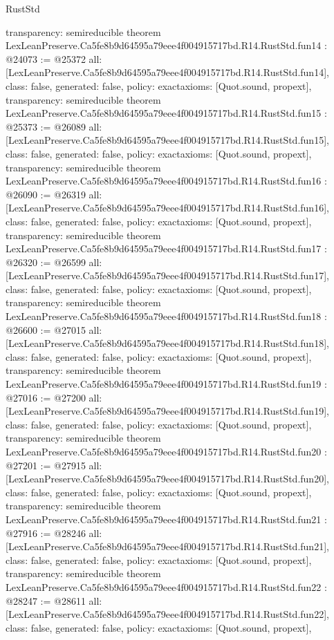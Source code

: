 \begin{lexlean}{RustStd}
\begin{coremodule}
{  transparency: semireducible
}
theorem LexLeanPreserve.Ca5fe8b9d64595a79eee4f004915717bd.R14.RustStd.fun14 : @24073 := @25372 {
  all: [LexLeanPreserve.Ca5fe8b9d64595a79eee4f004915717bd.R14.RustStd.fun14],
  class: false,
  generated: false,
  policy: exact{axioms: [Quot.sound, propext]},
  transparency: semireducible
}
theorem LexLeanPreserve.Ca5fe8b9d64595a79eee4f004915717bd.R14.RustStd.fun15 : @25373 := @26089 {
  all: [LexLeanPreserve.Ca5fe8b9d64595a79eee4f004915717bd.R14.RustStd.fun15],
  class: false,
  generated: false,
  policy: exact{axioms: [Quot.sound, propext]},
  transparency: semireducible
}
theorem LexLeanPreserve.Ca5fe8b9d64595a79eee4f004915717bd.R14.RustStd.fun16 : @26090 := @26319 {
  all: [LexLeanPreserve.Ca5fe8b9d64595a79eee4f004915717bd.R14.RustStd.fun16],
  class: false,
  generated: false,
  policy: exact{axioms: [Quot.sound, propext]},
  transparency: semireducible
}
theorem LexLeanPreserve.Ca5fe8b9d64595a79eee4f004915717bd.R14.RustStd.fun17 : @26320 := @26599 {
  all: [LexLeanPreserve.Ca5fe8b9d64595a79eee4f004915717bd.R14.RustStd.fun17],
  class: false,
  generated: false,
  policy: exact{axioms: [Quot.sound, propext]},
  transparency: semireducible
}
theorem LexLeanPreserve.Ca5fe8b9d64595a79eee4f004915717bd.R14.RustStd.fun18 : @26600 := @27015 {
  all: [LexLeanPreserve.Ca5fe8b9d64595a79eee4f004915717bd.R14.RustStd.fun18],
  class: false,
  generated: false,
  policy: exact{axioms: [Quot.sound, propext]},
  transparency: semireducible
}
theorem LexLeanPreserve.Ca5fe8b9d64595a79eee4f004915717bd.R14.RustStd.fun19 : @27016 := @27200 {
  all: [LexLeanPreserve.Ca5fe8b9d64595a79eee4f004915717bd.R14.RustStd.fun19],
  class: false,
  generated: false,
  policy: exact{axioms: [Quot.sound, propext]},
  transparency: semireducible
}
theorem LexLeanPreserve.Ca5fe8b9d64595a79eee4f004915717bd.R14.RustStd.fun20 : @27201 := @27915 {
  all: [LexLeanPreserve.Ca5fe8b9d64595a79eee4f004915717bd.R14.RustStd.fun20],
  class: false,
  generated: false,
  policy: exact{axioms: [Quot.sound, propext]},
  transparency: semireducible
}
theorem LexLeanPreserve.Ca5fe8b9d64595a79eee4f004915717bd.R14.RustStd.fun21 : @27916 := @28246 {
  all: [LexLeanPreserve.Ca5fe8b9d64595a79eee4f004915717bd.R14.RustStd.fun21],
  class: false,
  generated: false,
  policy: exact{axioms: [Quot.sound, propext]},
  transparency: semireducible
}
theorem LexLeanPreserve.Ca5fe8b9d64595a79eee4f004915717bd.R14.RustStd.fun22 : @28247 := @28611 {
  all: [LexLeanPreserve.Ca5fe8b9d64595a79eee4f004915717bd.R14.RustStd.fun22],
  class: false,
  generated: false,
  policy: exact{axioms: [Quot.sound, propext]},
}
\end{coremodule}
\end{lexlean}
